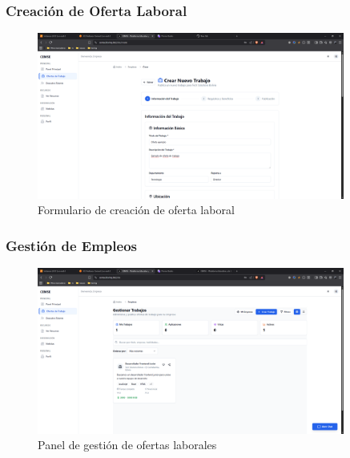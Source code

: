 \documentclass[12pt,a4paper]{article}
\begin{document}
\begin{enumerate}
\subsubsection{Creación de Oferta Laboral}
\begin{figure}[H]
    \centering
    \includegraphics[width=0.9\textwidth]{screenshots/companies/create-job.png}
    \caption{Formulario de creación de oferta laboral}
    \label{fig:company-create-job}
\end{figure}

\subsubsection{Gestión de Empleos}
\begin{figure}[H]
    \centering
    \includegraphics[width=0.9\textwidth]{screenshots/companies/job-management.png}
    \caption{Panel de gestión de ofertas laborales}
    \label{fig:company-jobs}
\end{figure}


\end{enumerate}
\end{document}
